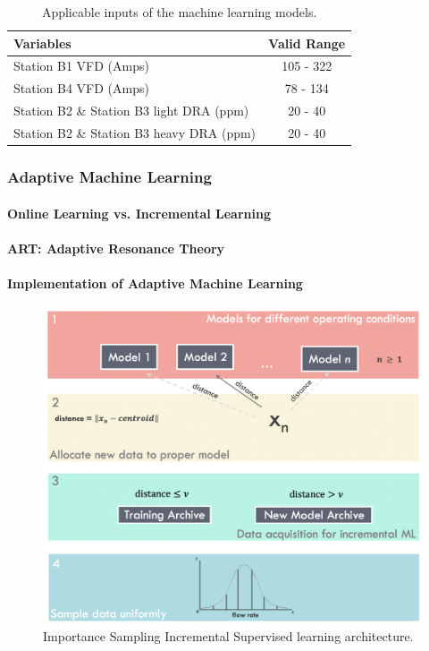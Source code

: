 \begin{table}[h]
    \centering
    {
    \begin{tabular}{ p{6cm} | c }
        Variables                               &  Valid Range            \\
        \hline
        Station B1 VFD (Amps)                     &      105 - 322          \\
        Station B4 VFD (Amps)                  &      78 - 134           \\ 
        Station B2 \& Station B3 light DRA (ppm)             &      20 - 40            \\
        Station B2 \& Station B3 heavy DRA (ppm)              &      20 - 40            \\
    \end{tabular}}
    \caption{Applicable inputs of the machine learning models.}
    \label{tab:08InputConst}
\end{table}

\subsubsection{Adaptive Machine Learning}


\paragraph{Online Learning vs. Incremental Learning}
\paragraph{ART: Adaptive Resonance Theory}
\paragraph{Implementation of Adaptive Machine Learning}

\begin{figure}
    \centering
    \includegraphics[width=\textwidth]{images/suncor/08IncrementalLearning.png}
    \caption{Importance Sampling Incremental Supervised learning architecture.}
    \label{fig:08ART}
\end{figure}

